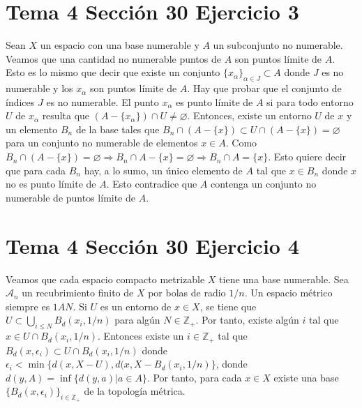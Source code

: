 \documentclass{article}
\begin{document}
\section{Tema 4 Sección 30 Ejercicio 3}
Sean $X$ un espacio con una base numerable y $A$ un subconjunto no numerable. Veamos que una cantidad  no numerable puntos de $A$ son puntos límite de $A$. Esto es lo mismo que decir que existe un conjunto $\{x_\alpha\}_{\alpha\in J}\subset A$ donde $J$ es no numerable y los $x_\alpha$ son puntos límite de $A$. Hay que probar que el conjunto de índices $J$ es no numerable. El punto $x_\alpha$ es punto límite de $A$ si para todo entorno $U$ de $x_\alpha$ resulta que $(A-\{x_\alpha\})\cap U\neq \varnothing$. Entonces, existe un entorno $U$ de $x$ y un elemento $B_n$ de la base tales que $B_n\cap  (A-\{x\})\subset U\cap  (A-\{x\})=\varnothing$ para un conjunto no numerable de elementos $x\in A$. Como $B_n\cap  (A-\{x\})=\varnothing \Rightarrow B_n\cap A-\{x\} =\varnothing\Rightarrow B_n\cap A =\{x\}$. Esto quiere decir que para cada $B_n$ hay, a lo sumo, un único elemento de $A$ tal que  $x\in B_n$ donde $x$ no es punto límite de $A$. Esto contradice que $A$ contenga un conjunto no numerable de puntos límite de $A$.
\section{Tema 4 Sección 30 Ejercicio 4}
Veamos que cada espacio compacto metrizable $X$ tiene una base numerable. Sea $\mathcal{A}_n$ un recubrimiento finito de $X$ por bolas de radio $1/n$. Un espacio métrico siempre es $1AN$. Si $U$ es un entorno de $x\in X$, se tiene que $U\subset \bigcup_{i\leq N} B_d(x_i,1/n)$ para algún $N\in \mathbb{Z}_+$. Por tanto, existe algún $i$ tal que $x\in U\cap B_d(x_i,1/n)$. Entonces existe un $i\in \mathbb{Z}_+$ tal que $B_d(x,\epsilon_i)\subset U \cap B_d(x_i,1/n)$ donde $\epsilon_i<\min\{ d(x,X-U),d(x,X-B_d(x_i,1/n)\}$, donde $d(y,A)=\inf\{d(y,a)|a\in A\}$. Por tanto, para cada $x\in X$ existe una base $\{B_d(x,\epsilon_i)\}_{i\in\mathbb{Z}_+}$ de la topología métrica.
\end{document}
